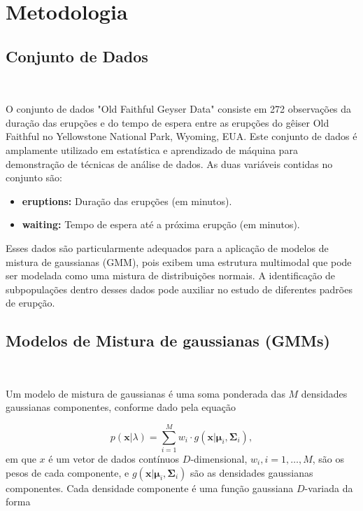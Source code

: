 \documentclass[12pt]{article}
\begin{document}
\section{Metodologia}

\subsection{Conjunto de Dados}

\

O conjunto de dados "Old Faithful Geyser Data"{} consiste em 272 observações da duração das erupções e do tempo de espera entre as erupções do gêiser Old Faithful no Yellowstone National Park, Wyoming, EUA. Este conjunto de dados é amplamente utilizado em estatística e aprendizado de máquina para demonstração de técnicas de análise de dados. As duas variáveis contidas no conjunto são:
\begin{itemize}
    \item \textbf{eruptions:} Duração das erupções (em minutos).
    \item \textbf{waiting:} Tempo de espera até a próxima erupção (em minutos).
\end{itemize}

Esses dados são particularmente adequados para a aplicação de modelos de mistura de gaussianas (GMM), pois exibem uma estrutura multimodal que pode ser modelada como uma mistura de distribuições normais. A identificação de subpopulações dentro desses dados pode auxiliar no estudo de diferentes padrões de erupção.


\subsection{Modelos de Mistura de gaussianas (GMMs)}

\

Um modelo de mistura de gaussianas é uma soma ponderada das $M$ densidades gaussianas componentes, conforme dado pela equação

\begin{equation}
p(\mathbf{x}|\lambda) = \sum_{i=1}^{M} w_i \cdot g(\mathbf{x}|\mathbf{\mu}_i, \mathbf{\Sigma}_i),
\end{equation}
em que $x$ é um vetor de dados contínuos $D$-dimensional, $w_i, i = 1, \ldots, M$, são os pesos de cada componente, e $g(\mathbf{x}|\mathbf{\mu}_i, \mathbf{\Sigma}_i)$ são as densidades gaussianas componentes. Cada densidade componente é uma função gaussiana $D$-variada da forma
\end{document}
